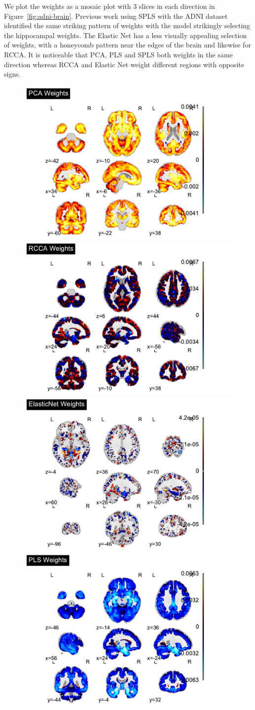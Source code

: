 We plot the \gls{weights} as a mosaic plot with 3 slices in each direction in Figure~\ref{fig:adni-brain}.
Previous work using SPLS with the ADNI dataset identified the same striking pattern of \gls{weights} with the model strikingly selecting the hippocampal weights\cite{monteiro2016multiple}.
The Elastic Net has a less visually appealing selection of weights, with a honeycomb pattern near the edges of the brain and likewise for RCCA.
It is noticeable that PCA, PLS and SPLS both \gls{weights} in the same direction whereas RCCA and Elastic Net weight different regions with opposite signs.

\begin{figure}
\centering
\includegraphics[width=0.45\linewidth]{figures/adni/PCA brain weights mosaic}
\includegraphics[width=0.45\linewidth]{figures/adni/RCCA brain weights mosaic}
\includegraphics[width=0.45\linewidth]{figures/adni/ElasticNet brain weights mosaic}
\includegraphics[width=0.45\linewidth]{figures/adni/PLS brain weights mosaic}

\end{figure}
